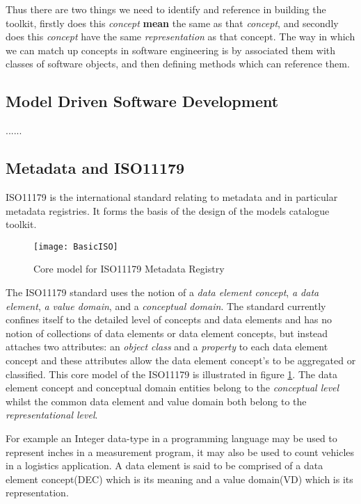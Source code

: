 Thus there are two things we need to identify and reference in
building the toolkit, firstly does this \emph{concept} \textbf{mean}
the same as that \emph{concept}, and secondly does this \emph{concept}
have the same \emph{representation} as that concept. The way in which
we can match up concepts in software engineering is by associated them
with classes of software objects, and then defining methods which can
reference them.

\subsection{Model Driven Software Development}
......



\subsection{Metadata and ISO11179}
ISO11179 is the international standard relating to metadata and in particular metadata registries. It forms the basis of the design of the models catalogue toolkit.

\begin{figure}[here]
	\texttt{[image: BasicISO]}
	\caption{Core model for ISO11179 Metadata Registry} 
	\label{fig:basicMDR}
\end{figure}

The ISO11179 standard uses the notion of a \emph{data element concept}, \emph{a data element}, \emph{a value domain}, and a \emph{conceptual domain}. The standard currently confines itself to the detailed level of concepts and data elements and has no notion of collections of data elements or data element concepts, but instead attaches two attributes: an \emph{object class} and a \emph{property} to each data element concept and these attributes allow the data element concept's to be aggregated or classified. This core model of the ISO11179 is illustrated in figure \ref{fig:basicMDR}. The data element concept and conceptual domain entities belong to the \emph{conceptual level}  whilst the common data element and value domain both belong to the \emph{representational level}.


For example an Integer data-type in a programming language may be used to represent inches in a measurement program, it may also be used to count vehicles in a logistics application.  A data element is said to be comprised of a data element concept(DEC) which is its meaning and a value domain(VD) which is its representation.

